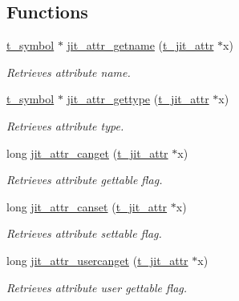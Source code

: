 \subsection*{Functions}
\begin{DoxyCompactItemize}
\item 
\hyperlink{structt__symbol}{t\_\-symbol} $\ast$ \hyperlink{group__attrmod_ga0c557da38fc8b2d94ca1de983e7ad603}{jit\_\-attr\_\-getname} (\hyperlink{structt__jit__attr}{t\_\-jit\_\-attr} $\ast$x)
\begin{DoxyCompactList}\small\item\em Retrieves attribute name. \item\end{DoxyCompactList}\item 
\hyperlink{structt__symbol}{t\_\-symbol} $\ast$ \hyperlink{group__attrmod_gae0ff1b6ee9a3303bbd9a0b4416640c0b}{jit\_\-attr\_\-gettype} (\hyperlink{structt__jit__attr}{t\_\-jit\_\-attr} $\ast$x)
\begin{DoxyCompactList}\small\item\em Retrieves attribute type. \item\end{DoxyCompactList}\item 
long \hyperlink{group__attrmod_ga92a547e00cde00059b6735fc6f371149}{jit\_\-attr\_\-canget} (\hyperlink{structt__jit__attr}{t\_\-jit\_\-attr} $\ast$x)
\begin{DoxyCompactList}\small\item\em Retrieves attribute gettable flag. \item\end{DoxyCompactList}\item 
long \hyperlink{group__attrmod_ga4cbadd8a5fb907e34faaef5368d2448e}{jit\_\-attr\_\-canset} (\hyperlink{structt__jit__attr}{t\_\-jit\_\-attr} $\ast$x)
\begin{DoxyCompactList}\small\item\em Retrieves attribute settable flag. \item\end{DoxyCompactList}\item 
long \hyperlink{group__attrmod_ga5c71cda4f1df64ec56442be1a7278c99}{jit\_\-attr\_\-usercanget} (\hyperlink{structt__jit__attr}{t\_\-jit\_\-attr} $\ast$x)
\begin{DoxyCompactList}\small\item\em Retrieves attribute user gettable flag. \item\end{DoxyCompactList}\item 

\end{DoxyCompactItemize}
